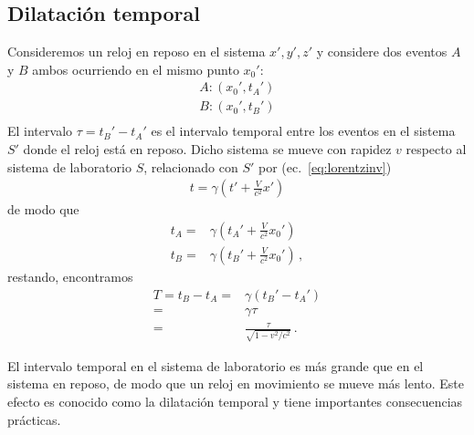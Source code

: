 \subsection{Dilatación temporal}
Consideremos un reloj en reposo en el sistema $x',y',z'$ y considere dos eventos $A$ y $B$ ambos ocurriendo en el mismo punto $x_0'$:
\begin{align*}
  A:(x_0',t_A')\nonumber\\
  B:(x_0',t_B')\nonumber\\
\end{align*}
El intervalo $\tau=t_B'-t_A'$ es el intervalo temporal entre los eventos en el sistema $S'$ donde el reloj está en reposo. Dicho sistema se mueve con rapidez $v$ respecto al sistema de laboratorio $S$, relacionado con $S'$ por (ec.~\eqref{eq:lorentzinv})
\begin{align*}
  t=\gamma\left(t'+\frac{V}{c^2}x'\right)
\end{align*}
de modo que
\begin{align*}
   t_A=&\gamma\left(t_A'+\frac{V}{c^2}x_0'\right)\nonumber\\
   t_B=&\gamma\left(t_B'+\frac{V}{c^2}x_0'\right)\,,
\end{align*}
restando, encontramos
\begin{align*}
  T=t_B-t_A=&\gamma(t_B'-t_A')\nonumber\\
  =&\gamma\tau\nonumber\\
  =&\frac{\tau}{\sqrt{1-v^2/c^2}}\,.
\end{align*}

El intervalo temporal en el sistema de laboratorio es más grande que en el sistema en reposo, de modo que un reloj en movimiento se mueve más lento. Este efecto es conocido como la dilatación temporal y tiene importantes consecuencias prácticas.


